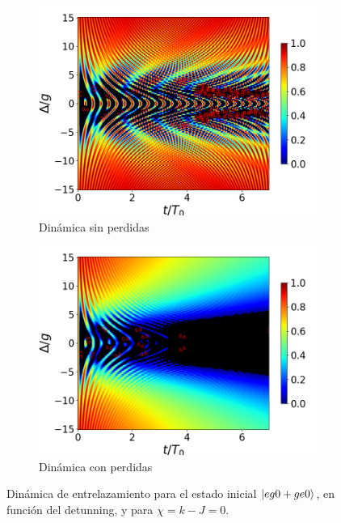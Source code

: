 \begin{figure}[H]
    \centering
    \begin{subfigure}{0.49\textwidth}
        \includegraphics[width=\textwidth]{figuras/ch4/concu/delta/eg1+ge1 k=0.0g x=0.0g J=0.0g gamma=0.25g concu delta uni.png}
        \caption{Dinámica sin perdidas}
        \label{fig4:concu detunning 1 uni}
    \end{subfigure}
    \hfill
    \begin{subfigure}{0.49\textwidth}
        \includegraphics[width=\textwidth]{figuras/ch4/concu/delta/eg1+ge1 k=0.0g x=0.0g J=0.0g gamma=0.25g concu delta dis.png}
        \caption{Dinámica con perdidas}
        \label{fig4:concu detunning 1 dis}
    \end{subfigure}
    \caption{Dinámica de entrelazamiento para el estado inicial $\ket{eg0+ge0}$, en función del detunning, y para $\chi=k-J=0$.}
    \label{fig4:concu detunning 1}
\end{figure}

